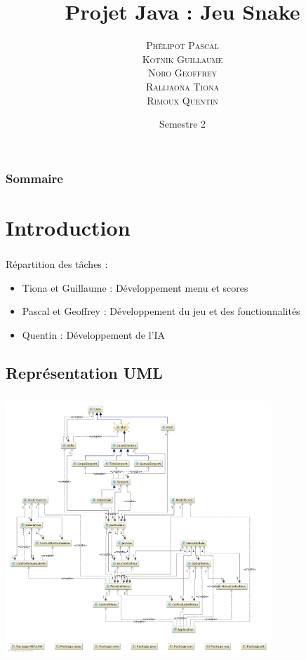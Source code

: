 \documentclass{beamer}
\author[\textsc{Phélipot\and Kotnik\and Noro\and Tiona\and Rimoux}]{\textsc{Phélipot Pascal\\ Kotnik Guillaume\\ Noro Geoffrey\\ Ralijaona Tiona\\ Rimoux Quentin}}
\title[Jeu Snake]{Projet Java : Jeu Snake}
\date{Semestre 2}
\begin{document}
\begin{frame}
\maketitle
\end{frame}

\begin{frame}
\frametitle{Sommaire}

\tableofcontents	
\end{frame}

\section{Introduction}
\begin{frame}
\frametitle{\insertsection}

Répartition des tâches :
\begin{itemize}
\item Tiona et Guillaume : Développement menu et scores
\item Pascal et Geoffrey : Développement du jeu et des fonctionnalités
\item Quentin : Développement de l'IA 
\end{itemize}
\end{frame}

\subsection{Représentation UML}
\begin{frame}
\includegraphics[width=10cm, height=10cm]{./diagram.png}
\end{frame}
\end{document}

